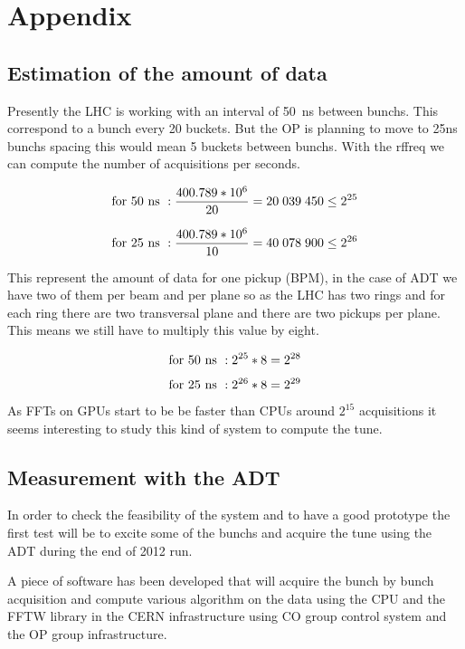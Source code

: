 %

\chapter{Appendix}

\section{Estimation of the amount of data}

Presently the \gls{LHC} is working with an interval of 50~ns between \glspl{bunch}. This correspond to a bunch every 20 \glspl{bucket}. But the \gls{OP} is planning to move to 25ns \glspl{bunch} spacing this would mean 5 \glspl{bucket} between \glspl{bunch}. With the \gls{rffreq} we can compute the number of acquisitions per seconds.

$${\rm for~}50{\rm ~ns}~: \frac{400.789*10^{6}}{20} = 20\;039\;450 \leq 2^{25}$$

$${\rm for~}25{\rm ~ns}~: \frac{400.789*10^{6}}{10} = 40\;078\;900 \leq 2^{26}$$ 

This represent the amount of data for one pickup (\gls{BPM}), in the case of \gls{ADT} we have two of them per beam and per plane so as the \gls{LHC} has two rings and for each ring there are two transversal plane and there are two pickups per plane. This means we still have to multiply this value by eight.

$${\rm for~}50{\rm ~ns}~: 2^{25} * 8 = 2^{28}$$

$${\rm for~}25{\rm ~ns}~: 2^{26} * 8 = 2^{29}$$

As \glspl{FFT} on \glspl{GPU} start to be be faster than \glspl{CPU} around $2^{15}$ acquisitions it seems interesting to study this kind of system to compute the \gls{tune}.

\section{Measurement with the ADT}

In order to check the feasibility of the system and to have a good prototype the first test will be to excite some of the \glspl{bunch} and acquire the \gls{tune} using the \gls{ADT} during the end of 2012 run\cite{Valuch12}.

A piece of software has been developed that will acquire the bunch by bunch acquisition and compute various algorithm on the data using the \gls{CPU} and the \gls{FFTW} library in the \gls{CERN} infrastructure using \gls{CO} group control system and the \gls{OP} group infrastructure.

